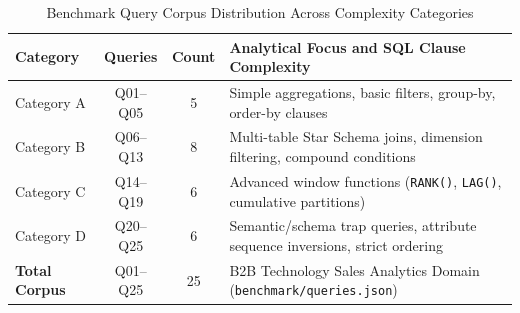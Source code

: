 \begin{table}[h]
\centering
\caption{Benchmark Query Corpus Distribution Across Complexity Categories}
\label{tab:query_corpus}
\begin{tabular}{lccl}
\hline
\textbf{Category} & \textbf{Queries} & \textbf{Count} & \textbf{Analytical Focus and SQL Clause Complexity} \\
\hline
Category A & Q01--Q05 & 5 & Simple aggregations, basic filters, group-by, order-by clauses \\
Category B & Q06--Q13 & 8 & Multi-table Star Schema joins, dimension filtering, compound conditions \\
Category C & Q14--Q19 & 6 & Advanced window functions (\texttt{RANK()}, \texttt{LAG()}, cumulative partitions) \\
Category D & Q20--Q25 & 6 & Semantic/schema trap queries, attribute sequence inversions, strict ordering \\
\hline
\textbf{Total Corpus} & Q01--Q25 & 25 & B2B Technology Sales Analytics Domain (\texttt{benchmark/queries.json}) \\
\hline
\end{tabular}
\end{table}
